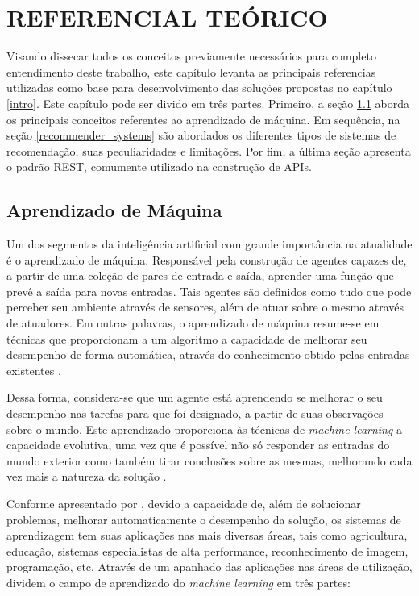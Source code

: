 \chapter{REFERENCIAL TEÓRICO}

Visando dissecar todos os conceitos previamente necessários para completo entendimento deste trabalho, este capítulo levanta as principais referencias utilizadas como base para desenvolvimento das soluções propostas no capítulo \ref{intro}. Este capítulo pode ser divido em três partes. Primeiro, a seção \ref{machine_learning} aborda os principais conceitos referentes ao aprendizado de máquina. Em sequência, na seção \ref{recommender_systems} são abordados os diferentes tipos de sistemas de recomendação, suas peculiaridades e limitações. Por fim, a última seção apresenta o padrão REST, comumente utilizado na construção de APIs.

\section{Aprendizado de Máquina} \label{machine_learning}

Um dos segmentos da inteligência artificial com grande importância na atualidade é o aprendizado de máquina. Responsável pela construção de agentes capazes de, a partir de uma coleção de pares de entrada e saída, aprender uma função que prevê a saída para novas entradas. Tais agentes são definidos como tudo que pode perceber seu ambiente através de sensores, além de atuar sobre o mesmo através de atuadores. Em outras palavras, o aprendizado de máquina resume-se em técnicas que proporcionam a um algoritmo a capacidade de melhorar seu desempenho de forma automática, através do conhecimento obtido pelas entradas existentes \cite{coppin2015inteligencia}.

Dessa forma, considera-se que um agente está aprendendo se melhorar o seu desempenho nas tarefas para que foi designado, a partir de suas observações sobre o mundo. Este aprendizado proporciona às técnicas de \textit{machine learning} a capacidade evolutiva, uma vez que é possível não só responder as entradas do mundo exterior como também tirar conclusões sobre as mesmas, melhorando cada vez mais a natureza da solução \cite{russell2004inteligencia}.

Conforme apresentado por , devido a capacidade de, além de solucionar problemas, melhorar automaticamente o desempenho da solução, os sistemas de aprendizagem tem suas aplicações nas mais diversas áreas, tais como agricultura, educação, sistemas especialistas de alta performance, reconhecimento de imagem, programação, etc. Através de um apanhado das aplicações nas áreas de utilização,  dividem o campo de aprendizado do \textit{machine learning} em três partes:


